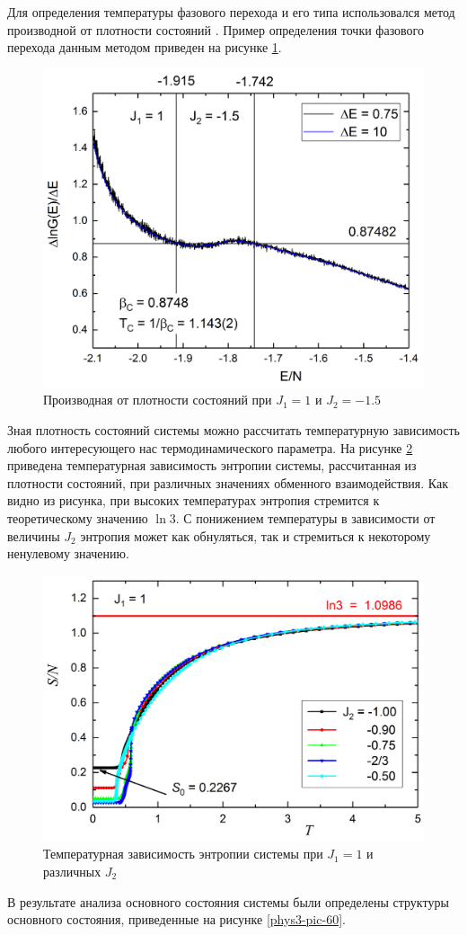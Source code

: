 Для определения температуры фазового перехода и его типа использовался метод производной от плотности состояний \cite{ph3_7}. Пример определения точки фазового перехода данным методом приведен на рисунке \ref{phys3-pic-40}.

\begin{figure}[H]
	\centering
	\includegraphics[width=0.5\linewidth]{content/sections/images/phys3-4}
	\caption{Производная от плотности состояний при $J_1 = 1$ и $J_2 = -1.5$}
\label{phys3-pic-40}
\end{figure}

Зная плотность состояний системы можно рассчитать температурную зависимость любого интересующего нас термодинамического параметра. На рисунке \ref{phys3-pic-50} приведена температурная зависимость энтропии системы, рассчитанная из плотности состояний, при различных значениях обменного взаимодействия. Как видно из рисунка, при высоких температурах энтропия стремится к теоретическому значению $\ln{3}$. С понижением температуры в зависимости от величины $J_2$ энтропия может как обнуляться, так и стремиться к некоторому ненулевому значению.

\begin{figure}[H]
	\centering
	\includegraphics[width=0.5\linewidth]{content/sections/images/phys3-5}
	\caption{Температурная зависимость энтропии системы при $J_1 = 1$ и различных $J_2$}
\label{phys3-pic-50}
\end{figure}

В результате анализа основного состояния системы были определены структуры основного состояния, приведенные на рисунке \ref{phys3-pic-60}.

